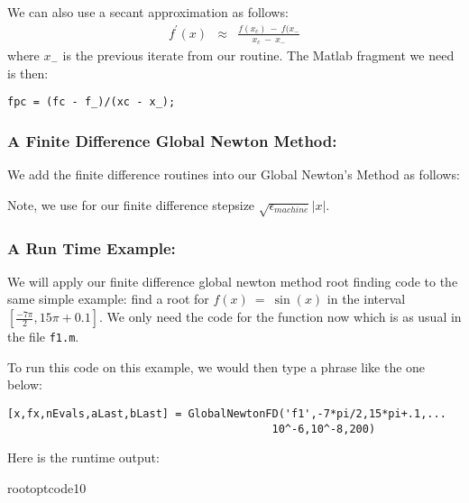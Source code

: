 \documentclass[11pt]{SelfArxOneColBMN}
\begin{document}
\noindent
We can also use a secant approximation as follows:
\begin{eqnarray*}
f^\prime(x) &\approx& \frac{f(x_c) \: - \: f(x_{-}}{x_c \: - \: x_{-}}
\end{eqnarray*}
\noindent
where $x_{-}$ is the previous iterate from our routine.
The Matlab fragment we need is then:

\singlespacing
{}
\begin{lstlisting}
fpc = (fc - f_)/(xc - x_);
\end{lstlisting}
\lstset{fancyvrb=false}
\onehalfspacing

\subsubsection{A Finite Difference Global Newton Method:}

We add the finite difference routines into our Global Newton's
Method as follows:

\singlespacing

\onehalfspacing

\noindent
Note, we use for our finite difference stepsize 
$\sqrt{\epsilon_{machine}} |x|$.

\subsubsection{A Run Time Example:}

We will apply our finite difference global newton method root finding code to
the same simple example: find a root for $f(x) \: = \: \sin(x)$ in the
interval $[\frac{-7 \pi}{2}, 15 \pi + 0.1]$.  We only need the code 
for the function now which is as usual in the file
{\tt f1.m}.

\noindent
To run this code on this example, we would then type
a phrase like the one below:

\singlespacing
{}
\begin{lstlisting}
[x,fx,nEvals,aLast,bLast] = GlobalNewtonFD('f1',-7*pi/2,15*pi+.1,...
                                         10^-6,10^-8,200)
\end{lstlisting}
\lstset{fancyvrb=false}
\onehalfspacing	

\noindent
Here is the runtime output:				 

%
{rootoptcode10}
\singlespacing

\onehalfspacing
\end{document}
